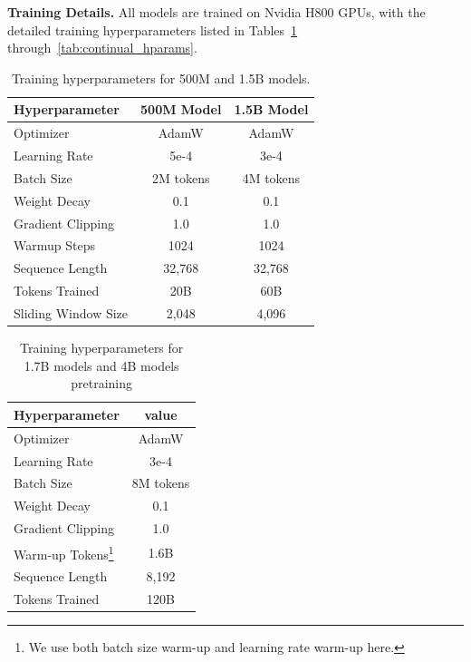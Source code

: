\textbf{Training Details.} All models are trained on Nvidia H800 GPUs, with the detailed training hyperparameters listed in Tables~\ref{tab:small_scale_hparams} through~\ref{tab:continual_hparams}.

\begin{table}[h!]
\centering
\caption{Training hyperparameters for 500M and 1.5B models.}
\label{tab:small_scale_hparams}
\begin{tabular}{lcc}
\toprule
\textbf{Hyperparameter} & \textbf{500M Model} & \textbf{1.5B Model} \\
\midrule
Optimizer & AdamW & AdamW \\
Learning Rate & 5e-4 & 3e-4 \\
Batch Size & 2M tokens & 4M tokens \\
Weight Decay & 0.1 & 0.1 \\
Gradient Clipping & 1.0 & 1.0 \\
Warmup Steps & 1024 & 1024 \\
\midrule
Sequence Length & 32,768 & 32,768 \\
Tokens Trained & 20B & 60B \\
Sliding Window Size & 2,048 & 4,096 \\
\bottomrule
\end{tabular}
\end{table}

\begin{table}[h!]
\centering
\caption{Training hyperparameters for 1.7B models and 4B models pretraining}
\label{tab:large_scale_hparams}
\begin{tabular}{lc}
\toprule
\textbf{Hyperparameter} & \textbf{value} \\
\midrule
Optimizer & AdamW  \\
Learning Rate & 3e-4  \\
Batch Size & 8M tokens  \\
Weight Decay & 0.1 \\
Gradient Clipping & 1.0  \\
Warm-up Tokens\footnote{We use both batch size warm-up and learning rate warm-up here.} & 1.6B \\
Sequence Length & 8,192  \\
Tokens Trained & 120B  \\
\bottomrule
\end{tabular}
\end{table}

